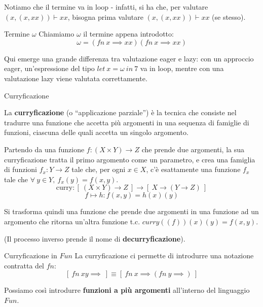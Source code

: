 \documentclass[a4paper,11pt]{report}
\begin{document}
Notiamo che il termine va in loop - infatti, si ha che, per valutare \((x, (x,xx))\vdash  xx \), bisogna prima valutare \((x, (x,xx))\vdash  xx \) (se stesso).

\begin{gbox}{Termine \( \omega \)}
    Chiamiamo \( \omega \) il termine appena introdotto:
    \[ \omega =  (fn \ x \implies xx)(fn \ x \implies xx) \]

    
\end{gbox}

Qui emerge una grande differenza tra valutazione eager e lazy: con un approccio eager, un'espressione del tipo \( let \ x = \omega \ in \ 7 \) va in loop, mentre con una valutazione lazy viene valutata correttamente.


\begin{defbox}{Curryficazione}{}

    La \textbf{curryficazione} (o ``applicazione parziale'') è la tecnica che consiste nel tradurre una funzione che accetta più argomenti in una sequenza di famiglie di funzioni, ciascuna delle quali accetta un singolo argomento.


    Partendo da una funzione \( f: (X \times Y) \to Z\) che prende due argomenti, la sua curryficazione tratta il primo argomento come un parametro, e crea una famiglia di funzioni \( f_x : Y \to Z \) tale che, per ogni \( x \in X  \), c'è esattamente una funzione \( f_x \) tale che \( \forall \ y \in Y , \  f_x(y)=f(x,y)\).
    \[ \text{curry}: [ \ (X \times Y) \to Z \ ] \to [ \ X \to (Y \to Z) \ ]\]
    \[ f \mapsto h : f(x, y) = h(x)(y) \]


Si trasforma quindi una funzione che prende due argomenti in una funzione ad un argomento che ritorna un'altra funzione t.c. \( curry((f))(x)(y) = f(x, y) \).

(Il processo inverso prende il nome di \textbf{decurryficazione}).

\end{defbox}

\begin{gbox}[colback=DeepGreenLight, colframe=DeepGreen, colbacktitle=DeepGreen]{Curryficazione in \( Fun \)}
    La curryficazione ci permette di introdurre una notazione contratta del \( fn \):
    \[ [ \ fn \ x y \implies \ ] \equiv [ \ fn \ x \implies ( fn \ y \implies ) \ ]\]

    Possiamo così introdurre \textbf{funzioni a più argomenti} all'interno del linguaggio \( Fun \).

\end{gbox}
\end{document}
